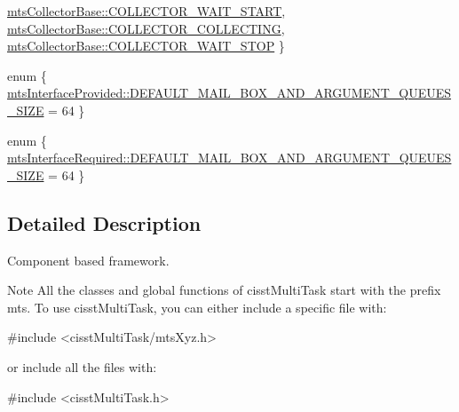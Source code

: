\begin{DoxyCompactItemize}
\hyperlink{group__cisst_multi_task_ggadfbc058665584a56933a7997229c1fb6a67657229ff967c447ed3289c730bdf11}{mts\+Collector\+Base\+::\+C\+O\+L\+L\+E\+C\+T\+O\+R\+\_\+\+W\+A\+I\+T\+\_\+\+S\+T\+A\+R\+T}, 
\hyperlink{group__cisst_multi_task_ggadfbc058665584a56933a7997229c1fb6a9162148874993d7a2bf7a40bd5b1ad24}{mts\+Collector\+Base\+::\+C\+O\+L\+L\+E\+C\+T\+O\+R\+\_\+\+C\+O\+L\+L\+E\+C\+T\+I\+N\+G}, 
\hyperlink{group__cisst_multi_task_ggadfbc058665584a56933a7997229c1fb6a84e8e4233359e044e0f7db8ddc04f8c5}{mts\+Collector\+Base\+::\+C\+O\+L\+L\+E\+C\+T\+O\+R\+\_\+\+W\+A\+I\+T\+\_\+\+S\+T\+O\+P}
 \}
\item 
enum \{ \hyperlink{group__cisst_multi_task_gga2829fb77136e0cf62eb7faba1adbd36da33b84c3e16f4aac5a431ebd0f1aa848f}{mts\+Interface\+Provided\+::\+D\+E\+F\+A\+U\+L\+T\+\_\+\+M\+A\+I\+L\+\_\+\+B\+O\+X\+\_\+\+A\+N\+D\+\_\+\+A\+R\+G\+U\+M\+E\+N\+T\+\_\+\+Q\+U\+E\+U\+E\+S\+\_\+\+S\+I\+Z\+E} = 64
 \}
\item 
enum \{ \hyperlink{group__cisst_multi_task_gga90cbb391949902dc64dac223e6917142a8b550bffbc9fcc1c50e42b45d36eaaec}{mts\+Interface\+Required\+::\+D\+E\+F\+A\+U\+L\+T\+\_\+\+M\+A\+I\+L\+\_\+\+B\+O\+X\+\_\+\+A\+N\+D\+\_\+\+A\+R\+G\+U\+M\+E\+N\+T\+\_\+\+Q\+U\+E\+U\+E\+S\+\_\+\+S\+I\+Z\+E} = 64
 \}
\end{DoxyCompactItemize}


\subsection{Detailed Description}
Component based framework.

\begin{DoxyNote}{Note}
All the classes and global functions of cisst\+Multi\+Task start with the prefix mts. To use cisst\+Multi\+Task, you can either include a specific file with\+: 
\begin{DoxyCode}
\textcolor{preprocessor}{#include <cisstMultiTask/mtsXyz.h>}
\end{DoxyCode}
 or include all the files with\+: 
\begin{DoxyCode}
\textcolor{preprocessor}{#include <cisstMultiTask.h>}
\end{DoxyCode}
 
\end{DoxyNote}


